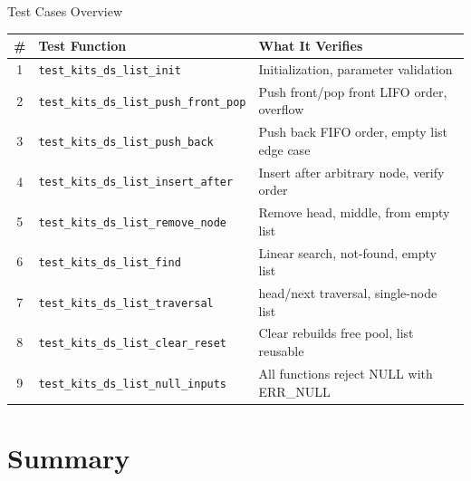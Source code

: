 \documentclass[aspectratio=169, 10pt]{beamer}
\begin{document}
\begin{frame}{Test Cases Overview}
\begin{table}
\centering
\small
\begin{tabular}{@{}clp{7cm}@{}}
\toprule
\textbf{\#} & \textbf{Test Function} & \textbf{What It Verifies} \\
\midrule
1 & \texttt{test\_kits\_ds\_list\_init}
  & Initialization, parameter validation \\
2 & \texttt{test\_kits\_ds\_list\_push\_front\_pop}
  & Push front/pop front LIFO order, overflow \\
3 & \texttt{test\_kits\_ds\_list\_push\_back}
  & Push back FIFO order, empty list edge case \\
4 & \texttt{test\_kits\_ds\_list\_insert\_after}
  & Insert after arbitrary node, verify order \\
5 & \texttt{test\_kits\_ds\_list\_remove\_node}
  & Remove head, middle, from empty list \\
6 & \texttt{test\_kits\_ds\_list\_find}
  & Linear search, not-found, empty list \\
7 & \texttt{test\_kits\_ds\_list\_traversal}
  & head/next traversal, single-node list \\
8 & \texttt{test\_kits\_ds\_list\_clear\_reset}
  & Clear rebuilds free pool, list reusable \\
9 & \texttt{test\_kits\_ds\_list\_null\_inputs}
  & All functions reject NULL with ERR\_NULL \\
\bottomrule
\end{tabular}
\end{table}
\end{frame}

\section{Summary}
\end{document}
